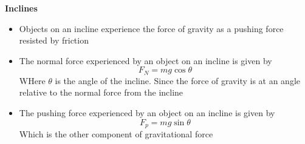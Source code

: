 \textbf{Inclines}
\begin{itemize}
    \item Objects on an incline experience the force of gravity as a pushing force resisted by friction
    \item The normal force experienced by an object on an incline is given by \[F_N=mg\cos\theta\] WHere $\theta$ is the angle of the incline. Since the force of gravity is at an angle relative to the normal force from the incline
    \item The pushing force experienced by an object on an incline is given by \[F_p=mg\sin\theta\] Which is the other component of gravitational force 
\end{itemize}
\newpage
